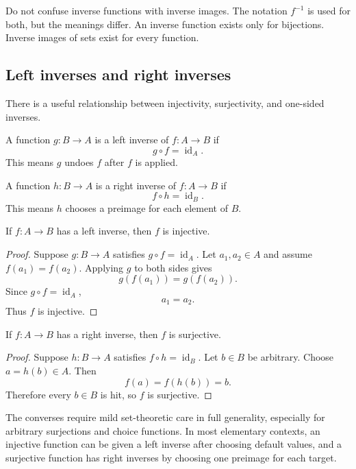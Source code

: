 \begin{trapbox}
Do not confuse inverse functions with inverse images. The notation $f^{-1}$ is used for both, but the meanings differ. An inverse function exists only for bijections. Inverse images of sets exist for every function.
\end{trapbox}

\subsection{Left inverses and right inverses}

There is a useful relationship between injectivity, surjectivity, and one-sided inverses.

A function $g:B\to A$ is a left inverse of $f:A\to B$ if
\[
g\circ f=\operatorname{id}_A.
\]
This means $g$ undoes $f$ after $f$ is applied.

A function $h:B\to A$ is a right inverse of $f:A\to B$ if
\[
f\circ h=\operatorname{id}_B.
\]
This means $h$ chooses a preimage for each element of $B$.

\begin{theorem}
If $f:A\to B$ has a left inverse, then $f$ is injective.
\end{theorem}

\begin{proof}
Suppose $g:B\to A$ satisfies $g\circ f=\operatorname{id}_A$. Let $a_1,a_2\in A$ and assume $f(a_1)=f(a_2)$. Applying $g$ to both sides gives
\[
g(f(a_1))=g(f(a_2)).
\]
Since $g\circ f=\operatorname{id}_A$,
\[
a_1=a_2.
\]
Thus $f$ is injective.
\end{proof}

\begin{theorem}
If $f:A\to B$ has a right inverse, then $f$ is surjective.
\end{theorem}

\begin{proof}
Suppose $h:B\to A$ satisfies $f\circ h=\operatorname{id}_B$. Let $b\in B$ be arbitrary. Choose $a=h(b)\in A$. Then
\[
f(a)=f(h(b))=b.
\]
Therefore every $b\in B$ is hit, so $f$ is surjective.
\end{proof}

The converses require mild set-theoretic care in full generality, especially for arbitrary surjections and choice functions. In most elementary contexts, an injective function can be given a left inverse after choosing default values, and a surjective function has right inverses by choosing one preimage for each target.

